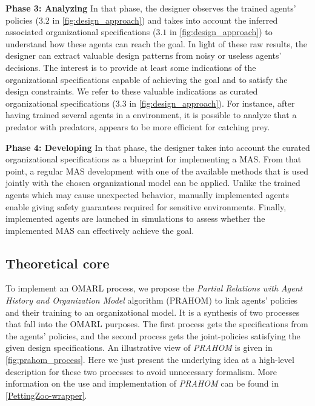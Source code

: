 \textbf{Phase 3: Analyzing} \quad In that phase, the designer observes the trained agents' policies ($3.2$ in \autoref{fig:design_approach}) and takes into account the inferred associated organizational specifications ($3.1$ in \autoref{fig:design_approach}) to understand how these agents can reach the goal. In light of these raw results, the designer can extract valuable design patterns from noisy or useless agents' decisions. The interest is to provide at least some indications of the organizational specifications capable of achieving the goal and to satisfy the design constraints. We refer to these valuable indications as curated organizational specifications ($3.3$ in \autoref{fig:design_approach}). For instance, after having trained several agents in a  environment, it is possible to analyze that a  predator with  predators, appears to be more efficient for catching prey.

\textbf{Phase 4: Developing} \quad In that phase, the designer takes into account the curated organizational specifications as a blueprint for implementing a MAS. From that point, a regular MAS development with one of the available methods that is used jointly with the chosen organizational model can be applied. Unlike the trained agents which may cause unexpected behavior, manually implemented agents enable giving safety guarantees required for sensitive environments. Finally, implemented agents are launched in simulations to assess whether the implemented MAS can effectively achieve the goal.

\subsection{Theoretical core}

To implement an OMARL process, we propose the \emph{Partial Relations with Agent History and Organization Model} algorithm (PRAHOM) to link agents' policies and their training to an organizational model.
It is a synthesis of two processes that fall into the OMARL purposes. The first process gets the specifications from the agents' policies, and the second process gets the joint-policies satisfying the given design specifications. An illustrative view of \emph{PRAHOM} is given in \autoref{fig:prahom_process}.
Here we just present the underlying idea at a high-level description for these two processes to avoid unnecessary formalism. More information on the use and implementation of \emph{PRAHOM} can be found in \autoref{PettingZoo-wrapper}.

